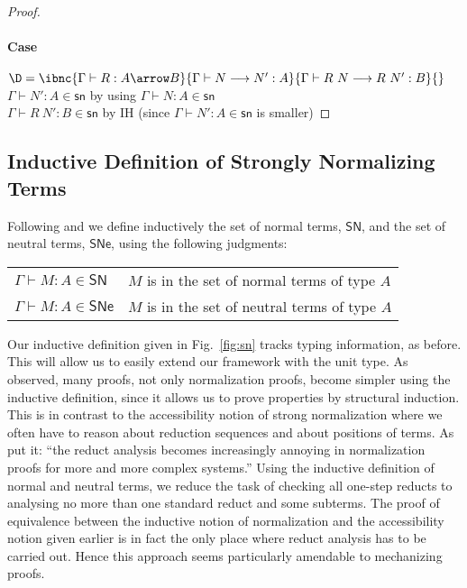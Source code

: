 \documentclass{article}
\newcommand{\SN}{\mathsf{SN}}
\newcommand{\SNe}{\mathsf{SNe}}
\newcommand{\csn}{\mathsf{sn}}
\newcommand{\red}{\longrightarrow}
\begin{document}
\begin{proof}
\paragraph{Case}
$\D = \ibnc {\Gamma \vdash R : A \arrow B}
{\Gamma \vdash N \red N' : A}
{\Gamma \vdash R~N \red R~N' : B}{}$
\\
$\Gamma \vdash N' : A \in \csn$ \hfill by using $\Gamma \vdash N : A \in \csn$ \\
$\Gamma \vdash R~N' : B \in \csn$ \hfill by IH (since $\Gamma \vdash N' : A \in \csn$ is smaller)

\end{proof}

\subsection{Inductive Definition of Strongly Normalizing Terms}
Following \cite{Raamsdonk_onnormalisation} and \cite{Joachimski2003} we define inductively the set of normal terms, $\SN$, and the set of neutral terms, $\SNe$, using the following judgments:

\begin{center}
\begin{tabular}{ll}
$\Gamma \vdash M : A \in \SN$  & $M$ is in the set of normal terms of  type $A$\\
$\Gamma \vdash M : A \in \SNe$ & $M$ is in the set of neutral terms of type $A$
\end{tabular}
\end{center}

Our inductive definition given in Fig.~\ref{fig:sn} tracks typing information, as before. This will allow us to easily extend our framework with the unit type.
As \cite{Raamsdonk_onnormalisation} observed, many proofs, not only normalization proofs, become simpler using the inductive definition, since it allows us  to prove properties by structural induction. This is in contrast to the accessibility notion of strong normalization where we often have to reason about reduction sequences and about positions of terms. As \cite{Joachimski2003}  put it: ``the reduct analysis becomes increasingly annoying in normalization proofs for more and more complex systems.'' Using the inductive definition of normal and neutral terms, we reduce the task of checking all one-step reducts to analysing no more than one standard reduct
and some subterms.  The proof of equivalence between the inductive notion of normalization and the accessibility notion given earlier is in fact the only place where reduct analysis has to be carried out.
Hence this approach seems particularly amendable to mechanizing proofs.
\end{document}
